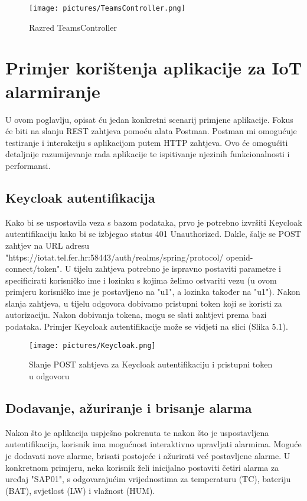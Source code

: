 \documentclass[times, utf8, zavrsni]{fer}
\begin{document}
\makeatletter
\setlength\@fptop{0pt} 
\setlength{} 
\setlength\@fpbot{0pt}
\makeatother
  \clearpage%
  \begin{figure}[t]%
    \centering
    \texttt{[image: pictures/TeamsController.png]}%
    \caption{Razred TeamsController}
    \label{fig:your-picture-label}
  \end{figure}


\chapter{ Primjer korištenja aplikacije za IoT alarmiranje}
U ovom poglavlju, opisat ću jedan konkretni scenarij primjene aplikacije. Fokus će biti na slanju REST zahtjeva pomoću alata Postman. Postman mi omogućuje testiranje i interakciju s aplikacijom putem HTTP zahtjeva. Ovo će omogućiti detaljnije razumijevanje rada aplikacije te ispitivanje njezinih funkcionalnosti i performansi.

\section{ Keycloak autentifikacija}
 Kako bi se uspostavila veza s bazom podataka, prvo je potrebno izvršiti Keycloak autentifikaciju kako bi se izbjegao status 401 Unauthorized. Dakle, šalje se POST zahtjev na URL adresu "https://iotat.tel.fer.hr:58443/auth/realms/spring/protocol/  
 openid-connect/token". U tijelu zahtjeva potrebno je ispravno postaviti parametre i specificirati korisničko ime i lozinku s kojima želimo ostvariti vezu (u ovom primjeru korisničko ime je postavljeno na "u1", a lozinka također na "u1"). Nakon slanja zahtjeva, u tijelu odgovora dobivamo pristupni token koji se koristi za autorizaciju. Nakon dobivanja tokena, mogu se slati zahtjevi prema bazi podataka. Primjer Keycloak autentifikacije može se vidjeti na slici (Slika 5.1).
 
 \begin{figure}[h!]
			\texttt{[image: pictures/Keycloak.png]} %
		\centering
			\caption{Slanje POST zahtjeva za Keycloak autentifikaciju i pristupni token u odgovoru}
			\label{fig:promjene}
     \end{figure}
  \newpage   
\section{ Dodavanje, ažuriranje i brisanje alarma}
Nakon što je aplikacija uspješno pokrenuta te nakon što je uspostavljena autentifikacija, korisnik ima mogućnost interaktivno upravljati alarmima. Moguće je dodavati nove alarme, brisati postojeće i ažurirati već postavljene alarme. U konkretnom primjeru, neka korisnik želi inicijalno postaviti četiri alarma za uređaj "SAP01", s odgovarajućim vrijednostima 
 za temperaturu (TC), bateriju (BAT), svjetlost (LW) i vlažnost (HUM).
\end{document}
